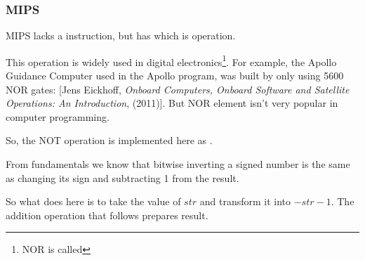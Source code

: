 ﻿\subsubsection{MIPS}




MIPS lacks a \NOT instruction, but has \NOR which is  operation.

This operation is widely used in digital electronics\footnote{NOR is called }.
For example, the Apollo Guidance Computer used in the Apollo program, 
was built by only using 5600 NOR gates:
[Jens Eickhoff, \emph{Onboard Computers, Onboard Software and Satellite Operations: An Introduction}, (2011)].
But NOR element isn't very popular in computer programming.

So, the NOT operation is implemented here as .

From fundamentals  we know that bitwise inverting a signed number is the same 
as changing its sign and subtracting 1 from the result.

So what \NOT does here is to take the value of $str$ and transform it into $-str-1$.
The addition operation that follows prepares result.

